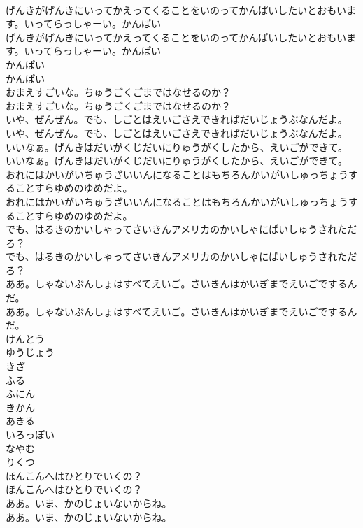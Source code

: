 \documentclass[8pt]{extreport}
\begin{document}
\begin{CJK}{UTF8}{min}
\\	げんきがげんきにいってかえってくることをいのってかんぱいしたいとおもいます。いってらっしゃーい。かんぱい
\\	げんきがげんきにいってかえってくることをいのってかんぱいしたいとおもいます。いってらっしゃーい。かんぱい
\\	かんぱい
\\	かんぱい
\\	おまえすごいな。ちゅうごくごまではなせるのか？
\\	おまえすごいな。ちゅうごくごまではなせるのか？
\\	いや、ぜんぜん。でも、しごとはえいごさえできればだいじょうぶなんだよ。
\\	いや、ぜんぜん。でも、しごとはえいごさえできればだいじょうぶなんだよ。
\\	いいなぁ。げんきはだいがくじだいにりゅうがくしたから、えいごができて。
\\	いいなぁ。げんきはだいがくじだいにりゅうがくしたから、えいごができて。
\\	おれにはかいがいちゅうざいいんになることはもちろんかいがいしゅっちょうすることすらゆめのゆめだよ。
\\	おれにはかいがいちゅうざいいんになることはもちろんかいがいしゅっちょうすることすらゆめのゆめだよ。
\\	でも、はるきのかいしゃってさいきんアメリカのかいしゃにばいしゅうされただろ？
\\	でも、はるきのかいしゃってさいきんアメリカのかいしゃにばいしゅうされただろ？
\\	ああ。しゃないぶんしょはすべてえいご。さいきんはかいぎまでえいごでするんだ。
\\	ああ。しゃないぶんしょはすべてえいご。さいきんはかいぎまでえいごでするんだ。
\\	けんとう
\\	ゆうじょう
\\	きざ
\\	ふる
\\	ふにん
\\	きかん
\\	あきる
\\	いろっぽい
\\	なやむ
\\	りくつ
\\	ほんこんへはひとりでいくの？
\\	ほんこんへはひとりでいくの？
\\	ああ。いま、かのじょいないからね。
\\	ああ。いま、かのじょいないからね。

\end{CJK}
\end{document}
